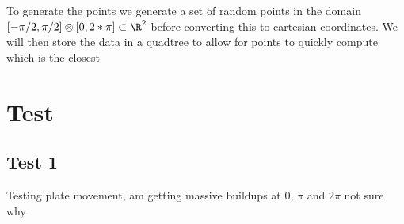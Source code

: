 \documentclass[11pt]{article}
\begin{document}
    To generate the points we generate a set of random points in the domain $[-\pi/2, \pi/2]\otimes[0, 2*\pi]\subset \R^2$ before converting this to cartesian coordinates.
    We will then store the data in a quadtree to allow for points to quickly compute which is the closest
    \section{Test}\label{sec:test}
    \subsection{Test 1}
    Testing plate movement, am getting massive buildups at 0, $\pi$ and $2\pi$ not sure why
    
    
\end{document}
